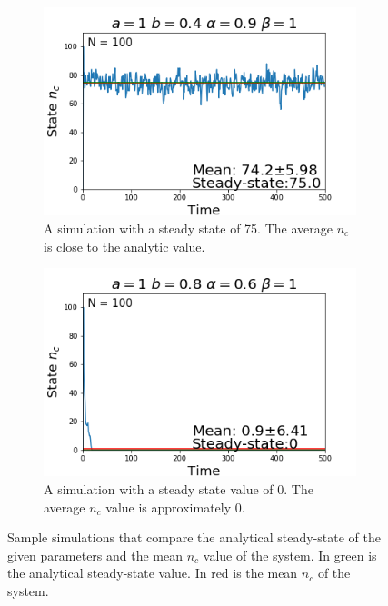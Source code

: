 \begin{figure}[h]
  \centering
  \begin{subfigure}[b]{0.4\linewidth}
    \includegraphics[width=\linewidth]{images/chapter3/ssA.png}
    \caption{A simulation with a steady state of 75. The average $n_{c}$ is close to the analytic value.}
  \end{subfigure}
  \begin{subfigure}[b]{0.4\linewidth}
    \includegraphics[width=\linewidth]{images/chapter3/ssB.png}
    \caption{A simulation with a steady state value of 0. The average $n_{c}$ value is approximately $0$.}
  \end{subfigure}
  \caption{Sample simulations that compare the analytical steady-state of the given parameters and the mean $n_{c}$ value of the system. In green is the analytical steady-state value. In red is the mean $n_{c}$ of the system.}
  \label{fig:compareSingleSS}
\end{figure}

